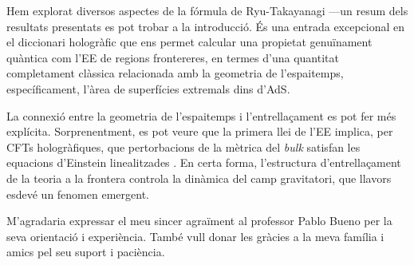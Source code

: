 \documentclass[twocolumn]{revtex4}
\begin{document}
Hem explorat diversos aspectes de la fórmula de Ryu-Takayanagi ---un resum dels resultats presentats es pot trobar a la introducció. És una entrada excepcional en el diccionari hologràfic que ens permet calcular una propietat genuïnament quàntica com l'EE de regions frontereres, en termes d'una quantitat completament clàssica relacionada amb la geometria de l'espaitemps, específicament, l'àrea de superfícies extremals dins d'AdS.

La connexió entre la geometria de l'espaitemps i l'entrellaçament es pot fer més explícita. Sorprenentment, es pot veure que la primera llei de l'EE implica, per CFTs hologràfiques, que pertorbacions de la mètrica del \emph{bulk} satisfan les equacions d'Einstein linealitzades \cite{faulkner_gravitation_2014}. En certa forma, l'estructura d'entrellaçament de la teoria a la frontera controla la dinàmica del camp gravitatori, que llavors esdevé un fenomen emergent.


\begin{acknowledgments}

    M'agradaria expressar el meu sincer agraïment al professor Pablo Bueno per la seva orientació i experiència. També vull donar les gràcies a la meva família i amics pel seu suport i paciència.
    
\end{acknowledgments}




% 
\end{document}

